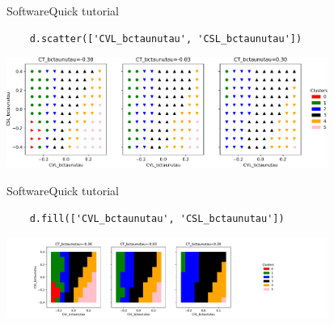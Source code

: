 \begin{frame}[fragile, t]{Software}{Quick tutorial}
\vspace{0.75cm}
\begin{verbatim}
    d.scatter(['CVL_bctaunutau', 'CSL_bctaunutau'])
\end{verbatim}
\vspace{0.2cm}
\centering
\includegraphics[width=10.5cm]{figures/plots/2dpoints.pdf}
\end{frame}

\begin{frame}[fragile, t]{Software}{Quick tutorial}
\vspace{0.75cm}
\begin{verbatim}
    d.fill(['CVL_bctaunutau', 'CSL_bctaunutau'])
\end{verbatim}
\centering
\includegraphics[trim=3cm 0 11cm 0, clip, width=10.5cm]{figures/plots/2dfill.pdf}
\end{frame}

